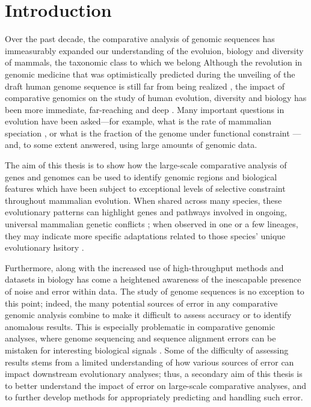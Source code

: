 \chapter{Introduction}
\label{ch_intro}

Over the past decade, the comparative analysis of genomic sequences
has immeasurably expanded our understanding of the evoluion, biology
and diversity of mammals, the taxonomic class to which we belong
Although the revolution in genomic
medicine that was optimistically predicted during the unveiling of the
draft human genome sequence is still far from being realized
\citep{Collins2001,Varmus2010}, the impact of comparative genomics on
the study of human evolution, diversity and biology has been more
immediate, far-reaching and deep \citep{OBrien1999,Lander2011}. Many
important questions in evolution have been asked---for example, what
is the rate of mammalian speciation
\citep{BinindaEmonds2007,Venditti2011}, or what is the fraction of the
genome under functional constraint
\citep{Boffelli2003a,Siepel2005,Ponting2011}---and, to some extent
answered, using large amounts of genomic data.

The aim of this thesis is to show how the large-scale comparative
analysis of genes and genomes can be used to identify genomic regions
and biological features which have been subject to exceptional levels
of selective constraint throughout mammalian evolution. When shared
across many species, these evolutionary patterns can highlight genes
and pathways involved in ongoing, universal mammalian genetic
conflicts \citep{CastilloDavis2004}; when observed in one or a few
lineages, they may indicate more specific adaptations related to those
species' unique evolutionary hsitory \citep{Messier1997,Sawyer2005a,Nielsen2007}.

Furthermore, along with the increased use of high-throughput methods
and datasets in biology has come a heightened awareness of the
inescapable presence of noise and error within data. The study of
genome sequences is no exception to this point; indeed, the many
potential sources of error in any comparative genomic analysis combine
to make it difficult to assess accuracy or to identify anomalous
results. This is especially problematic in comparative genomic
analyses, where genome sequencing and sequence alignment errors can be
mistaken for interesting biological signals
\citep{Mallick2009,Schneider2009,Fletcher2010,MarkovaRaina2011}. Some
of the difficulty of assessing results stems from a limited
understanding of how various sources of error can impact downstream
evolutionary analyses; thus, a secondary aim of this thesis is to
better understand the impact of error on large-scale comparative
analyses, and to further develop methods for appropriately predicting
and handling such error.

